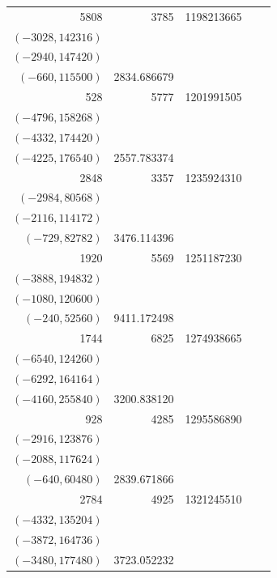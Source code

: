 \documentclass[11pt]{article}
\begin{document}
\begin{longtable}{r r r l r}
5808 & 3785 & 1198213665 & \begin{tabular}[t]{@{}l@{}}$(-3520,93280)$\\$(-3028,142316)$\\$(-2940,147420)$\\$(-660,115500)$\end{tabular} & 2834.686679\\[5pt]
528 & 5777 & 1201991505 & \begin{tabular}[t]{@{}l@{}}$(-5292,122220)$\\$(-4796,158268)$\\$(-4332,174420)$\\$(-4225,176540)$\end{tabular} & 2557.783374\\[5pt]
2848 & 3357 & 1235924310 & \begin{tabular}[t]{@{}l@{}}$(-3204,54468)$\\$(-2984,80568)$\\$(-2116,114172)$\\$(-729,82782)$\end{tabular} & 3476.114396\\[5pt]
1920 & 5569 & 1251187230 & \begin{tabular}[t]{@{}l@{}}$(-4840,154440)$\\$(-3888,194832)$\\$(-1080,120600)$\\$(-240,52560)$\end{tabular} & 9411.172498\\[5pt]
1744 & 6825 & 1274938665 & \begin{tabular}[t]{@{}l@{}}$(-6720,77280)$\\$(-6540,124260)$\\$(-6292,164164)$\\$(-4160,255840)$\end{tabular} & 3200.838120\\[5pt]
928 & 4285 & 1295586890 & \begin{tabular}[t]{@{}l@{}}$(-3428,113124)$\\$(-2916,123876)$\\$(-2088,117624)$\\$(-640,60480)$\end{tabular} & 2839.671866\\[5pt]
2784 & 4925 & 1321245510 & \begin{tabular}[t]{@{}l@{}}$(-4860,49140)$\\$(-4332,135204)$\\$(-3872,164736)$\\$(-3480,177480)$\end{tabular} & 3723.052232\\[5pt]

\end{longtable}
\end{document}
